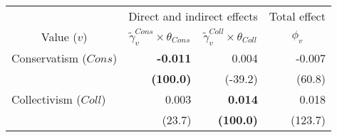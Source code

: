 
\begin{tabular}{lrrr}
\toprule
\multicolumn{1}{c}{ } & \multicolumn{2}{c}{Direct and indirect effects} & \multicolumn{1}{c}{Total effect} \\
\cmidrule(l{3pt}r{3pt}){2-3} \cmidrule(l{3pt}r{3pt}){4-4}
\multicolumn{1}{c}{Value ($v$)} & \multicolumn{1}{c}{$\widetilde{\gamma}^{Cons}_v \times \theta_{Cons}$} & \multicolumn{1}{c}{$\widetilde{\gamma}^{Coll}_v \times \theta_{Coll}$} & \multicolumn{1}{c}{${\phi}_v$}\\
\midrule
Conservatism ($Cons$) & \textbf{-0.011} & 0.004 & -0.007\\
 & \textbf{(100.0)} & (-39.2) & (60.8)\\
Collectivism ($Coll$) & 0.003 & \textbf{0.014} & 0.018\\
 & (23.7) & \textbf{(100.0)} & (123.7)\\
\bottomrule
\end{tabular}
